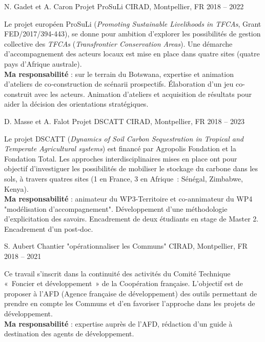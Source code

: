 \begin{cventries}
  \cventry
  {N. Gadet et A. Caron} %
  {Projet ProSuLi} %
  {CIRAD, Montpellier, FR} %
  {2018 -- 2022} %
  {
    \begin{cvitems} %
      Le projet européen ProSuLi (\emph{Promoting Sustainable Livelihoods in TFCAs}, Grant FED/2017/394-443), se donne pour ambition d'explorer les possibilités de gestion collective des \emph{TFCAs} (\emph{Transfrontier Conservation Areas}). Une démarche d’accompagnement des acteurs locaux est mise en place dans quatre sites (quatre pays d’Afrique australe).\\
      \textbf{Ma responsabilité} : sur le terrain du Botswana, expertise et animation d’ateliers de co‑construction de scénarii prospectifs. Élaboration d'un jeu co-construit avec les acteurs. Animation d'ateliers et acquisition de résultats pour aider la décision des orientations stratégiques.
    \end{cvitems}
  }

  \cventry
  {D. Masse et A. Falot} %
  {Projet DSCATT} %
  {CIRAD, Montpellier, FR} %
  {2018 -- 2023} %
  {
    \begin{cvitems} %
        Le projet DSCATT (\emph{Dynamics of Soil Carbon Sequestration in Tropical and Temperate Agricultural systems}) est financé par Agropolis Fondation et la Fondation Total. Les approches interdisciplinaires mises en place ont pour objectif d’investiguer les possibilités de mobiliser le stockage du carbone dans les sols, à travers quatres sites (1 en France, 3 en Afrique : Sénégal, Zimbabwe, Kenya).\\
        \textbf{Ma responsabilité} : animateur du WP3-Territoire et co-annimateur du WP4 "modélisation d'accompagnement". Développement d’une méthodologie d’explicitation des savoirs. Encadrement de deux étudiants en stage de Master 2. Encadrement d’un post‑doc.
    \end{cvitems}
  }

  \cventry
  {S. Aubert} %
  {Chantier "opérationnaliser les Communs"} %
  {CIRAD, Montpellier, FR} %
  {2018 -- 2021} %
  {
    \begin{cvitems} %
      Ce travail s’inscrit dans la continuité des activités du Comité Technique « Foncier et développement » de la Coopération française. L’objectif est de proposer à l’AFD (Agence française de développement) des outils permettant de prendre en compte les Communs et d’en favoriser l’approche dans les projets de développement.\\
      \textbf{Ma responsabilité} : expertise auprès de l'AFD, rédaction d'un guide à destination des agents de développement.
    \end{cvitems}
  }


\end{cventries}
